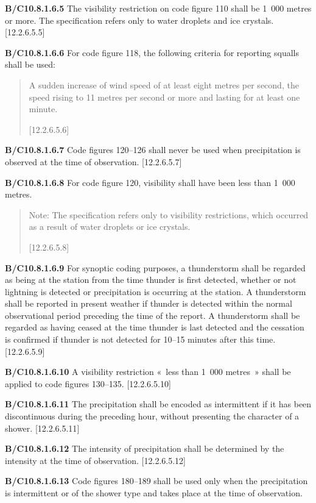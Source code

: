 \textbf{B/C10.8.1.6.5} The visibility restriction on code figure 110 shall be 1~000 metres or more. The specification refers only to water droplets and ice crystals. {[}12.2.6.5.5{]}

\textbf{B/C10.8.1.6.6} For code figure 118, the following criteria for reporting squalls shall be used:

\begin{quote}
A sudden increase of wind speed of at least eight metres per second, the speed rising to 11 metres per second or more and lasting for at least one minute.

{[}12.2.6.5.6{]}
\end{quote}

\textbf{B/C10.8.1.6.7} Code figures 120--126 shall never be used when precipitation is observed at the time of observation. {[}12.2.6.5.7{]}

\textbf{B/C10.8.1.6.8} For code figure 120, visibility shall have been less than 1~000 metres.

\begin{quote}
Note: The specification refers only to visibility restrictions, which occurred as a result of water droplets or ice crystals.

{[}12.2.6.5.8{]}
\end{quote}

\textbf{B/C10.8.1.6.9} For synoptic coding purposes, a thunderstorm shall be regarded as being at the station from the time thunder is first detected, whether or not lightning is detected or precipitation is occurring at the station. A thunderstorm shall be reported in present weather if thunder is detected within the normal observational period preceding the time of the report. A thunderstorm shall be regarded as having ceased at the time thunder is last detected and the cessation is confirmed if thunder is not detected for 10--15 minutes after this time. {[}12.2.6.5.9{]}

\textbf{B/C10.8.1.6.10} A visibility restriction «~less than 1~000 metres~» shall be applied to code figures 130--135. {[}12.2.6.5.10{]}

\textbf{B/C10.8.1.6.11} The precipitation shall be encoded as intermittent if it has been discontinuous during the preceding hour, without presenting the character of a shower. {[}12.2.6.5.11{]}

\textbf{B/C10.8.1.6.12} The intensity of precipitation shall be determined by the intensity at the time of observation. {[}12.2.6.5.12{]}

\textbf{B/C10.8.1.6.13} Code figures 180--189 shall be used only when the precipitation is intermittent or of the shower type and takes place at the time of observation.

